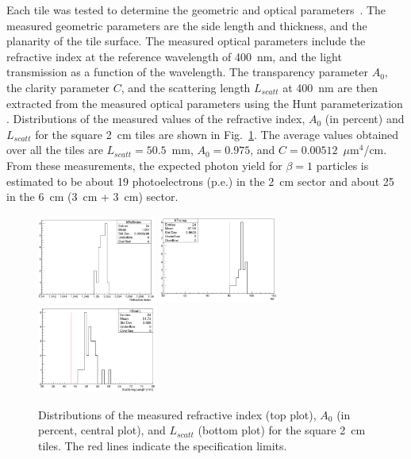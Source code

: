 \documentclass[5p,times,twocolumn]{elsarticle}
\begin{document}
Each tile was tested to determine the geometric and optical parameters~\cite{REF:RICH2016mc}. The measured
geometric parameters are the side length and thickness, and the planarity of the tile surface. The measured optical
parameters include the refractive index at the reference wavelength of 400~nm, and the light transmission as a
function of the wavelength. The transparency parameter $A_0$, the clarity parameter $C$, and the scattering length
$L_{scatt}$ at 400~nm are then extracted from the measured optical parameters using the Hunt parameterization
\cite{REF:Hunt}. Distributions of the measured values of the refractive index, $A_0$ (in percent) and $L_{scatt}$ for the
square 2~cm tiles are shown in Fig.~\ref{Fig:Aerogel_2cm}. The average values obtained over all the tiles are
$L_{scatt} = 50.5$~mm, $A_0 = 0.975$, and $C = 0.00512$~$\mu$m$^4$/cm. From these measurements, the expected
photon yield for $\beta=1$ particles is estimated to be about 19 photoelectrons (p.e.) in the 2~cm sector and about 25
in the 6~cm (3~cm + 3~cm) sector.

\begin{figure}
\begin{center}
\includegraphics[width=0.35\textwidth]{AeroRefInd_2cm.pdf}
\includegraphics[width=0.35\textwidth]{AeroA0_2cm.pdf}
\includegraphics[width=0.35\textwidth]{AeroLscatt_2cm.pdf}
\caption{Distributions of the measured refractive index (top plot), $A_0$ (in percent, central plot), and $L_{scatt}$
  (bottom plot) for the square 2~cm tiles. The red lines indicate the specification limits.}
\label{Fig:Aerogel_2cm}
\end{center}
\end{figure}
\end{document}
